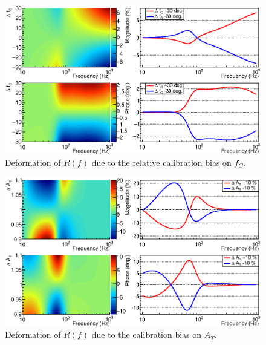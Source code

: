\begin{figure}
\begin{center}
\includegraphics[width=\linewidth]{Figures/appa-cal2.eps}
\caption{Deformation of $R(f)$ due to the relative calibration bias on $f_C$.}
\label{fig:appa-cal2} 
\end{center}
\end{figure}

\begin{figure}
\begin{center}
\includegraphics[width=\linewidth]{Figures/appa-cal3.eps}
\caption{Deformation of $R(f)$ due to the calibration bias on $A_T$.}
\label{fig:appa-cal3} 
\end{center}
\end{figure}

\newpage
